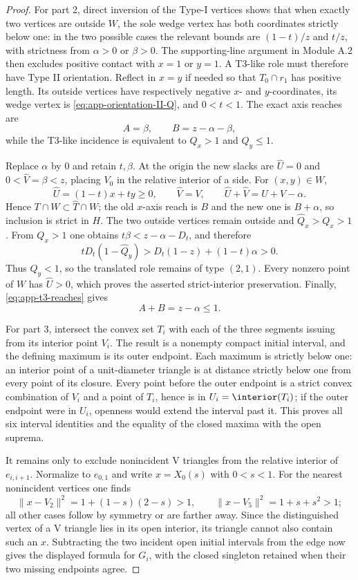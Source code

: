 \begin{proof}
For part 2, direct inversion of the Type-I vertices shows that when exactly
two vertices are outside $W$, the sole wedge vertex has both coordinates
strictly below one: in the two possible cases the relevant bounds are
$(1-t)/z$ and $t/z$, with strictness from $\alpha>0$ or $\beta>0$.
The supporting-line argument in Module A.2 then excludes positive contact
with $x=1$ or $y=1$.  A T3-like role must therefore have Type II orientation.
Reflect in $x=y$ if needed so that $T_0\cap r_1$ has positive length.  Its
outside vertices have respectively negative $x$- and $y$-coordinates, its
wedge vertex is \eqref{eq:app-orientation-II-Q}, and $0<t<1$.  The exact axis
reaches are
\begin{equation}
 A=\beta,
 \qquad
 B=z-\alpha-\beta,
 \label{eq:app-t3-reaches}
\end{equation}
while the T3-like incidence is equivalent to $Q_x>1$ and $Q_y\le1$.

Replace $\alpha$ by $0$ and retain $t,\beta$.  At the origin the new slacks
are $\widehat U=0$ and $0<\widehat V=\beta<z$, placing $V_0$ in the relative
interior of a side.  For $(x,y)\in W$,
\[
 \widehat U=(1-t)x+ty\ge0,
 \qquad
 \widehat V=V,
 \qquad
 \widehat U+\widehat V=U+V-\alpha.
\]
Hence $T\cap W\subset\widehat T\cap W$; the old $x$-axis reach is $B$ and
the new one is $B+\alpha$, so inclusion is strict in $H$.  The two outside
vertices remain outside and $\widehat Q_x>Q_x>1$.  From $Q_x>1$ one obtains
$t\beta<z-\alpha-D_t$, and therefore
\[
 tD_t(1-\widehat Q_y)
 >D_t(1-z)+(1-t)\alpha>0.
\]
Thus $\widehat Q_y<1$, so the translated role remains of type $(2,1)$.
Every nonzero point of $W$ has $\widehat U>0$, which proves the asserted
strict-interior preservation.  Finally, \eqref{eq:app-t3-reaches} gives
\[
 A+B=z-\alpha\le1.
\]

For part 3, intersect the convex set $T_i$ with each of the three segments
issuing from its interior point $V_i$.  The result is a nonempty compact
initial interval, and the defining maximum is its outer endpoint.  Each
maximum is strictly below one: an interior point of a unit-diameter triangle
is at distance strictly below one from every point of its closure.  Every
point before the outer endpoint is a strict convex combination of $V_i$ and
a point of $T_i$, hence is in $U_i=\interior(T_i)$; if the outer endpoint
were in $U_i$, openness would extend the interval past it.  This proves all
six interval identities and the equality of the closed maxima with the open
suprema.

It remains only to exclude nonincident V triangles from the relative
interior of $e_{i,i+1}$.  Normalize to $e_{0,1}$ and write
$x=X_0(s)$ with $0<s<1$.  For the nearest nonincident vertices one finds
\[
 \lVert x-V_2\rVert^2=1+(1-s)(2-s)>1,
 \qquad
 \lVert x-V_5\rVert^2=1+s+s^2>1;
\]
all other cases follow by symmetry or are farther away.  Since the
distinguished vertex of a V triangle lies in its open interior, its triangle
cannot also contain such an $x$.  Subtracting the two incident open initial
intervals from the edge now gives the displayed formula for $G_i$, with the
closed singleton retained when their two missing endpoints agree.
\end{proof}

